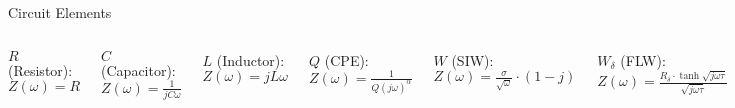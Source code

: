 \documentclass[10pt,compress,handout]{beamer}
\begin{document}
    \begin{frame}{Circuit Elements}
        \begin{columns}
                $R$ (Resistor): $Z(\omega)=R$ 

                $C$ (Capacitor): $Z(\omega)=\frac{1}{jC\omega}$

                $L$ (Inductor): $Z(\omega)=jL\omega$

                $Q$ (CPE\footnotemark[4]): $Z(\omega)=\frac{1}{Q(j\omega)^{\alpha}}$

                $W$ (SIW\footnotemark[1]): $Z(\omega)=\frac{\sigma}{\sqrt{\omega}} \cdot (1-j)$
                
                $W_{\delta}$ (FLW\footnotemark[2]): $Z(\omega)=\frac{R_{\delta} \cdot \tanh \sqrt{j\omega\tau}}{\sqrt{j\omega\tau}}$
                
                $W_m$ (FSW\footnotemark[3]): $Z(\omega)=\frac{R_{m} \cdot \coth \sqrt{j\omega\tau}}{\sqrt{j\omega\tau}}$
                \texttt{[image: EIS-example-np\_circuit\_elements]}
        \end{columns}
    \end{frame}
    
\end{document}
